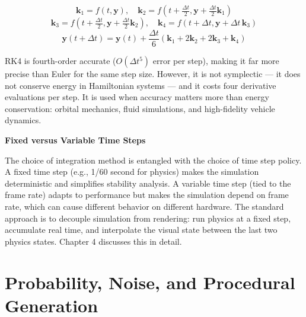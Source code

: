 \documentclass[
  11pt,
  letterpaper,
  DIV=11,
  numbers=noendperiod,
  twoside,
  open=right]{scrreprt}
\begin{document}
\[
\mathbf{k}_1 = f(t, \mathbf{y}), \quad
\mathbf{k}_2 = f(t + \tfrac{\Delta t}{2}, \mathbf{y} + \tfrac{\Delta t}{2} \mathbf{k}_1)
\] \[
\mathbf{k}_3 = f(t + \tfrac{\Delta t}{2}, \mathbf{y} + \tfrac{\Delta t}{2} \mathbf{k}_2), \quad
\mathbf{k}_4 = f(t + \Delta t, \mathbf{y} + \Delta t \, \mathbf{k}_3)
\] \[
\mathbf{y}(t + \Delta t) = \mathbf{y}(t) + \frac{\Delta t}{6} (\mathbf{k}_1 + 2\mathbf{k}_2 + 2\mathbf{k}_3 + \mathbf{k}_4)
\]

RK4 is fourth-order accurate (\(O(\Delta t^5)\) error per step), making
it far more precise than Euler for the same step size. However, it is
not symplectic --- it does not conserve energy in Hamiltonian systems
--- and it costs four derivative evaluations per step. It is used when
accuracy matters more than energy conservation: orbital mechanics, fluid
simulations, and high-fidelity vehicle dynamics.

\begin{tcolorbox}[enhanced jigsaw, arc=.35mm, bottomrule=.15mm, breakable, colback=white, colframe=quarto-callout-note-color-frame, left=2mm, leftrule=.75mm, opacityback=0, rightrule=.15mm, toprule=.15mm]
\begin{minipage}[t]{5.5mm}
\textcolor{quarto-callout-note-color}{\faInfo}
\end{minipage}%
\begin{minipage}[t]{\textwidth - 5.5mm}

\vspace{-3mm}\textbf{Fixed versus Variable Time Steps}\vspace{3mm}

The choice of integration method is entangled with the choice of time
step policy. A fixed time step (e.g., 1/60 second for physics) makes the
simulation deterministic and simplifies stability analysis. A variable
time step (tied to the frame rate) adapts to performance but makes the
simulation depend on frame rate, which can cause different behavior on
different hardware. The standard approach is to decouple simulation from
rendering: run physics at a fixed step, accumulate real time, and
interpolate the visual state between the last two physics states.
Chapter 4 discusses this in detail.

\end{minipage}%
\end{tcolorbox}

\section{Probability, Noise, and Procedural
Generation}\label{probability-noise-and-procedural-generation}
\end{document}
